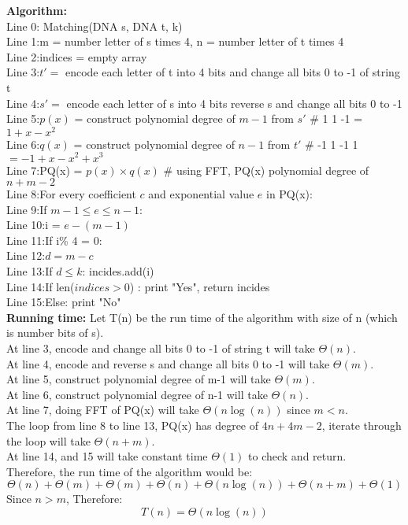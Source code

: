 \documentclass[11pt]{article}
\newenvironment{qparts}{\begin{enumerate}[{(}a{)}]}{\end{enumerate}}
\newcommand{\tab}{\hspace*{2em}}
\begin{document}
\begin{qparts}
\noindent
\textbf{Algorithm:}\\
\large{}
Line 0: Matching(DNA s, DNA t, k)\\
Line 1:\tab m = number letter of s times 4, n = number letter of t times 4\\
Line 2:\tab indices = empty array\\
Line 3:\tab $t\prime =$ encode each letter of t into 4 bits and change all bits 0 to -1 of string t \\
Line 4:\tab $s\prime =$ encode each letter of s into 4 bits reverse s and change all bits 0 to -1\\
Line 5:\tab $p(x)$ = construct polynomial degree of $m-1$ from $s\prime$ \# 1 1 -1 = $1 + x - x^2$ \\
Line 6:\tab $q(x)$ = construct polynomial degree of $n-1$ from $t\prime$ \# -1 1 -1 1 $= -1 + x -x^2 + x^3$\\
Line 7:\tab PQ(x) = $p(x)\times q(x)$ \# using FFT, PQ(x) polynomial degree of $n+m-2$\\
Line 8:\tab For every coefficient  $c$ and exponential value $e$ in PQ(x):\\
Line 9:\tab\tab If $m- 1\leqslant e\leqslant n-1$:\\ 
Line 10:\tab\tab\tab i = $e - (m-1)$\\
Line 11:\tab\tab\tab If  i\% 4 = 0: \\
Line 12:\tab\tab\tab\tab $d = m - c$\\
Line 13:\tab\tab\tab\tab If $d\leqslant k$: incides.add(i)\\
Line 14:\tab If len($indices > 0$) : print "Yes", return incides\\
Line 15:\tab Else: print "No"\\

\Large{}
\noindent
\textbf{Running time:}
Let T(n) be the run time of the algorithm with size of n (which is number bits of s).\\
At line 3, encode and change all bits 0 to -1 of string t will take $\Theta(n)$.\\
At line 4, encode and reverse s and change all bits 0 to -1 will take $\Theta(m)$.\\
At line 5, construct polynomial degree of m-1 will take $\Theta(m)$.\\
At line 6, construct polynomial degree of n-1 will take $\Theta(n)$.\\
At line 7, doing FFT of PQ(x) will take $\Theta(n\log(n))$ since $m < n$.\\
The loop from line 8 to line 13, PQ(x) has degree of $4n+4m-2$, iterate through the loop will take $\Theta(n+m)$.\\
At line 14, and 15 will take constant time $\Theta(1)$ to check and return.\\
Therefore, the run time of the algorithm would be:
$$\Theta(n) + \Theta(m) + \Theta(m) + \Theta(n) + \Theta(n\log(n)) + \Theta(n + m) + \Theta(1)$$
Since $n > m$, Therefore:
$$\boxed{T(n) = \Theta(n\log(n))}$$


\end{qparts}
\end{document}
